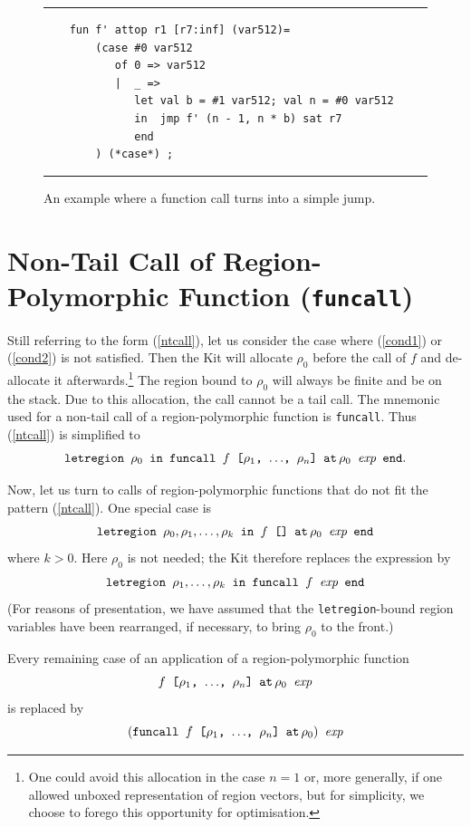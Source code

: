 \documentclass[12pt]{book}
\begin{document}
\begin{figure}
\hrule \medskip
\begin{verbatim}
    fun f' attop r1 [r7:inf] (var512)= 
        (case #0 var512 
           of 0 => var512
           |  _ => 
              let val b = #1 var512; val n = #0 var512
              in  jmp f' (n - 1, n * b) sat r7
              end 
        ) (*case*) ; 
\end{verbatim}
\caption{An example where a function call 
         turns into a simple jump.}
\medskip
\hrule
\label{tail.fig}
\end{figure}

\section{Non-Tail Call of Region-Polymorphic Function ({\tt funcall})}
Still referring to the form (\ref{ntcall}), let us consider the
case where (\ref{cond1}) or (\ref{cond2}) is not satisfied.
Then the Kit will allocate $\rho_0$ before the call of $f$ 
and de-allocate it afterwards.\footnote{One could avoid this
allocation in the case $n=1$ or, more generally, if one
allowed unboxed representation of region vectors, but for
simplicity, we choose to forego this opportunity for optimisation.} 
The region bound to 
$\rho_0$ will always be finite and be on the stack. 
Due to this allocation, the call cannot be a tail call. The
mnemonic used for a non-tail call of a region-polymorphic function
is {\tt funcall}. Thus (\ref{ntcall}) is simplified to 
$$\hbox{\tt letregion $\rho_0$ in funcall $f$ [$\rho_1$, $\ldots$, $\rho_n$] $\mathbin{\hbox{\tt at}}\,\rho_0$ $\hbox{\it exp}$ end}.$$


Now, let us turn to calls of region-polymorphic functions that do not fit the
pattern (\ref{ntcall}). One special case is
$$\hbox{\tt letregion $\rho_0,\rho_1,\ldots,\rho_k$ in $f$ [] $\mathbin{\hbox{\tt at}}\,\rho_0$ $\hbox{\it exp}$ end}
$$
where  $k>0$. Here $\rho_0$ is not needed; the Kit therefore replaces
the expression by 
$$\hbox{\tt letregion $\rho_1,\ldots,\rho_k$ in funcall $f$  $\hbox{\it exp}$ end}
$$
(For reasons of presentation, we have assumed that the
\texttt{letregion}-bound region variables have been rearranged, if
necessary, to bring $\rho_0$ to the front.)

Every remaining case of an application of a region-polymorphic function
       $$\hbox{\tt $f$ [$\rho_1$, $\ldots$, $\rho_n$] $\mathbin{\hbox{\tt at}}\,\rho_0$ $\hbox{\it exp}$}$$
is replaced by 
       $$\hbox{\tt $($funcall $f$ [$\rho_1$, $\ldots$, $\rho_n$] $\mathbin{\hbox{\tt at}}\,\rho_0)$ $\hbox{\it exp}$}$$
\end{document}
